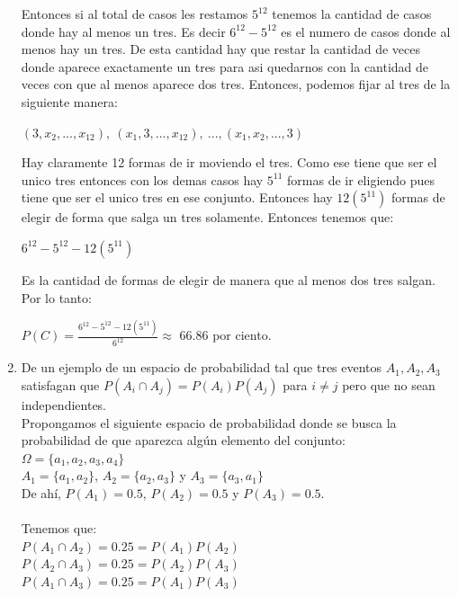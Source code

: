 \documentclass[12pt,a4paper]{report}
\begin{document}
\begin{enumerate}
{\begin{enumerate}[label=\alph*) ]
{\begin{center}
    \end{center}
    Entonces si al total de casos les restamos $5^{12}$ tenemos la cantidad de casos donde hay al menos un tres. Es decir $6^{12}-5^{12}$ es el numero de casos donde al menos hay un tres. De esta cantidad hay que restar la cantidad de veces donde aparece exactamente un tres para asi quedarnos con la cantidad de veces con que al menos aparece dos tres. Entonces, podemos fijar al tres de la siguiente manera:\\
    \begin{center}
    $(3,x_{2},...,x_{12}), \ (x_{1},3,...,x_{12}), \ ... ,(x_{1},x_{2},...,3)$
    \end{center}
    Hay claramente 12 formas de ir moviendo el tres. Como ese tiene que ser el unico tres entonces con los demas casos hay $5^{11}$ formas de ir eligiendo pues tiene que ser el unico tres en ese conjunto. Entonces hay $12(5^{11})$ formas de elegir de forma que salga un tres solamente. Entonces tenemos que:\\
    \begin{center}
    $6^{12}-5^{12}-12(5^{11})$
    \end{center}
    Es la cantidad de formas de elegir de manera que al menos dos tres salgan. Por lo tanto:\\
    \begin{center}
    $P(C)=\frac{6^{12}-5^{12}-12(5^{11})}{6^{12}} \approx$ 66.86 por ciento.
    \end{center}
    
    }
    \end{enumerate}
	}


   \item {
   De un ejemplo de un espacio de probabilidad tal que tres eventos $A_{1},A_{2},A_{3}$ satisfagan que $P(A_{i}\cap A_{j})=P(A_{i})P(A_{j})$ para $i\neq j$ pero que no sean independientes.\\
     Propongamos el siguiente espacio de probabilidad donde se busca la probabilidad de que aparezca algún elemento del conjunto:\\
  $\Omega = \lbrace a_{1}, a_{2}, a_{3}, a_{4} \rbrace$\\
  $A_{1} = \lbrace a_{1}, a_{2} \rbrace$, $A_{2} = \lbrace a_{2}, a_{3} \rbrace$ y $A_{3} =  \lbrace a_{3}, a_{1} \rbrace$\\
  De ahí, $P(A_{1}) = 0.5$, $P(A_{2}) = 0.5$ y $P(A_{3}) = 0.5$.\\\\
  Tenemos que:\\
  $P(A_{1} \cap A_{2}) = 0.25 = P(A_{1})P(A_{2})$\\
  $P(A_{2} \cap A_{3}) = 0.25 = P(A_{2})P(A_{3})$\\
  $P(A_{1} \cap A_{3}) = 0.25 = P(A_{1})P(A_{3})$\\

}
\end{enumerate}
\end{document}
